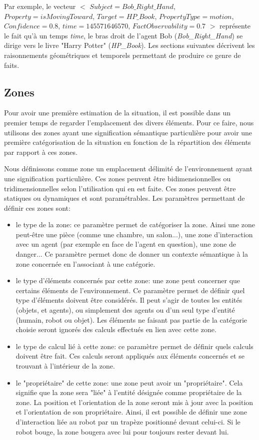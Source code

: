 \documentclass[a4paper,11pt,twoside]{StyleThese}
\begin{document}
Par exemple, le vecteur 
$<$ $Subject = Bob\_Right\_Hand$, $Property = isMovingToward$, $Target = HP\_Book$, $PropertyType = motion$, $Confidence = 0.8$, $time = 145571646570$, $FactObservability = 0.7$ $>$ représente le fait qu'à un temps \textit{time}, le bras droit de l'agent Bob (\textit{Bob\_Right\_Hand}) se dirige vers le livre "Harry Potter" (\textit{HP\_Book}).
Les sections suivantes décrivent les raisonnements géométriques et temporels 
permettant de produire ce genre de faits.


\subsection{Zones}
\label{sec:zones}

Pour avoir une première estimation de la situation, il est possible dans un premier temps de regarder l'emplacement des divers éléments. Pour ce faire, nous utilisons des zones ayant une signification sémantique particulière pour avoir une première catégorisation de la situation en fonction de la répartition des éléments par rapport à ces zones.

Nous définissons comme zone un emplacement délimité de l'environnement ayant une signification particulière. Ces zones peuvent être bidimensionnelles ou tridimensionnelles selon l'utilisation qui en est faite. Ces zones peuvent être statiques ou dynamiques et sont paramétrables. Les paramètres permettant de définir ces zones sont:
\begin{itemize}
\item le type de la zone: ce paramètre permet de catégoriser la zone. Ainsi une zone peut-être une pièce (comme une chambre, un salon...), une zone d'interaction avec un agent (par exemple en face de l'agent en question), une zone de danger...
Ce paramètre permet donc de donner un contexte sémantique à la zone concernée en l'associant à une catégorie.
\item le type d'éléments concernés par cette zone: une zone peut concerner que certains éléments de l'environnement. Ce paramètre permet de définir quel type d'éléments doivent être considérés. Il peut s'agir de toutes les entités (objets, et agents), ou simplement des agents ou d'un seul type d'entité (humain, robot ou objet). Les éléments ne faisant pas partie de la catégorie choisie seront ignorés des calculs effectués en lien avec cette zone.
\item le type de calcul lié à cette zone: ce paramètre permet de définir quels calculs doivent être fait. Ces calculs seront appliqués aux éléments concernés et se trouvant à l'intérieur de la zone.
\item le "propriétaire" de cette zone: une zone peut avoir un "propriétaire". Cela signifie que la zone sera "liée" à l'entité désignée comme propriétaire de la zone.  La position et l'orientation de la zone seront mis à jour avec la position et l'orientation de son propriétaire. Ainsi, il est possible de définir une zone d'interaction liée au robot par un trapèze positionné devant celui-ci. Si le robot bouge, la zone bougera avec lui pour toujours rester devant lui.
\end{itemize}
\end{document}
